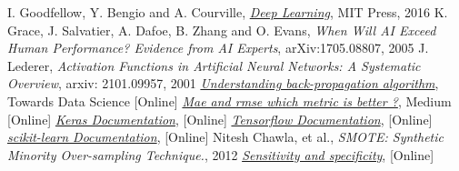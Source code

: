  
\begin{thebibliography}{9}
 I. Goodfellow, Y. Bengio and A. Courville, \href{http://www.deeplearningbook.org}{\emph{Deep Learning}}, MIT Press, 2016
K. Grace, J. Salvatier, A. Dafoe, B. Zhang and O. Evans, \emph{When Will AI Exceed Human Performance? Evidence from AI Experts}, arXiv:1705.08807, 2005
 J. Lederer, \emph{Activation Functions in Artificial Neural Networks: A Systematic Overview}, arxiv: 2101.09957, 2001
\href{https://towardsdatascience.com/understanding-backpropagation-algorithm-7bb3aa2f95fd}{\emph{Understanding back-propagation algorithm}}, Towards Data Science [Online]
\href{https://medium.com/human-in-a-machine-world/mae-and-rmse-which-metric-is-better-e60ac3bde13d}{\emph{Mae and rmse which metric is better ?}}, Medium [Online]
\href{https://keras.io/}{\emph{Keras Documentation}}, [Online]  
\href{https://www.tensorflow.org/}{\emph{Tensorflow Documentation}}, [Online] 
\href{https://scikit-learn.org/stable/}{\emph{scikit-learn Documentation}}, [Online]
Nitesh Chawla, et al., \emph{SMOTE: Synthetic Minority Over-sampling Technique.}, 2012
\href{https://en.wikipedia.org/wiki/Sensitivity_and_specificity}{\emph{Sensitivity and specificity}}, [Online]
\end{thebibliography}